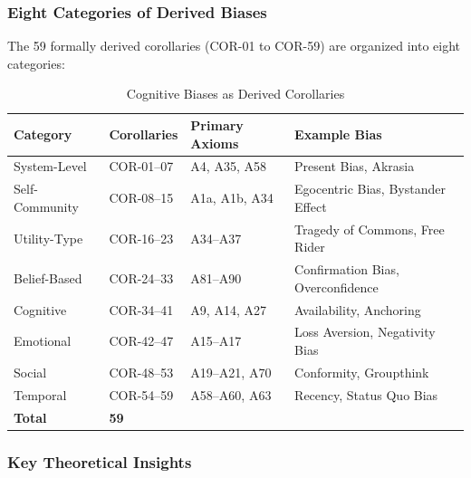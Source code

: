 \subsubsection{Eight Categories of Derived Biases}

The 59 formally derived corollaries (COR-01 to COR-59) are organized into eight categories:

\begin{table}[htbp]
\centering
\caption{Cognitive Biases as Derived Corollaries}
\label{tab:bias-corollaries-summary}
\renewcommand{\arraystretch}{1.3}
\begin{tabular}{@{}llll@{}}
\toprule
\textbf{Category} & \textbf{Corollaries} & \textbf{Primary Axioms} & \textbf{Example Bias} \\
\midrule
System-Level & COR-01--07 & A4, A35, A58 & Present Bias, Akrasia \\
Self-Community & COR-08--15 & A1a, A1b, A34 & Egocentric Bias, Bystander Effect \\
Utility-Type & COR-16--23 & A34--A37 & Tragedy of Commons, Free Rider \\
Belief-Based & COR-24--33 & A81--A90 & Confirmation Bias, Overconfidence \\
Cognitive & COR-34--41 & A9, A14, A27 & Availability, Anchoring \\
Emotional & COR-42--47 & A15--A17 & Loss Aversion, Negativity Bias \\
Social & COR-48--53 & A19--A21, A70 & Conformity, Groupthink \\
Temporal & COR-54--59 & A58--A60, A63 & Recency, Status Quo Bias \\
\midrule
\textbf{Total} & \textbf{59} & & \\
\bottomrule
\end{tabular}
\end{table}

\subsubsection{Key Theoretical Insights}

